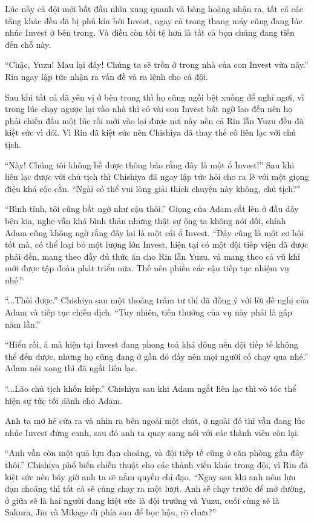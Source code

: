 {Lúc này cả đội mới bắt đầu nhìn xung quanh và bàng hoàng nhận ra, tất cả
các tầng khác đều đã bị phủ kín bới Invest, ngay cả trong thang máy cũng
đang lúc nhúc Invest ở bên trong. Và điều còn tồi tệ hơn là tất cả bọn
chúng đang tiến đến chỗ này.

``Chậc, Yuzu! Mau lại đây! Chúng ta sẽ trốn ở trong nhà của con Invest
vừa nãy.'' Rin ngay lập tức nhận ra vấn đề và ra lệnh cho cả đội.

Sau khi tất cả đã yên vị ở bên trong thì họ cũng ngồi bệt xuống để nghỉ
ngơi, vì trong lúc chạy ngược lại vào nhà thì có vài con Invest bất ngờ
lao đến nên họ phải chiến đấu một lúc rồi mới vào lại được nơi này nên
cả Rin lẫn Yuzu đều đã kiệt sức vì đói. Vì Rin đã kiệt sức nên Chishiya
đã thay thế cô liên lạc với chủ tịch.

``Này! Chúng tôi không hề được thông báo rằng đây là một ổ Invest!'' Sau
khi liên lạc được với chủ tịch thì Chishiya đã ngay lập tức hỏi cho ra
lẽ với một giọng điệu khá cộc cằn. ``Ngài có thể vui lòng giải thích
chuyện này không, chủ tịch?''

``Bình tĩnh, tôi cũng bất ngờ như cậu thôi.'' Giọng của Adam cất lên ở
đầu dây bên kia, nghe vẫn khá bình thản nhưng thật sự ông ta không nói
dối, chính Adam cũng không ngờ rằng đây lại là một cái ổ Invest. ``Đây
cũng là một cơ hội tốt mà, có thể loại bỏ một lượng lớn Invest, hiện tại
có một đội tiếp viện đã được phái đến, mang theo đầy đủ thức ăn cho Rin
lẫn Yuzu, và mang theo cả vũ khí mới được tập đoàn phát triển nữa. Thế
nên phiền các cậu tiếp tục nhiệm vụ nhé.''

``...Thôi được.'' Chishiya sau một thoáng trầm tư thì đã đồng ý với lời
đề nghị của Adam và tiếp tục chiến dịch. ``Tuy nhiên, tiền thưởng của vụ
này phải là gấp năm lần.''

``Hiểu rồi, à mà hiện tại Invest đang phong toả khá đông nên đội tiếp tế
không thể đến được, nhưng họ cũng đang ở gần đó đấy nên mọi người cố
chạy qua nhé.'' Adam nói xong thì đã ngắt liên lạc.

``...Lão chủ tịch khốn kiếp.'' Chishiya sau khi Adam ngắt liên lạc thì
vò tóc thể hiện sự tức tối dành cho Adam.

Anh ta mở hé cửa ra và nhìn ra bên ngoài một chút, ở ngoài đó thì vẫn
đang lúc nhúc Invest đứng canh, sau đó anh ta quay sang nói với các
thành viên còn lại.

``Anh vẫn còn một quả lựu đạn choáng, và đội tiếp tế cũng ở căn phòng
gần đây thôi.'' Chishiya phổ biến chiến thuật cho các thành viên khác
trong đội, vì Rin đã kiệt sức nên bây giờ anh ta sẽ nắm quyền chỉ đạo.
``Ngay sau khi anh ném lựu đạn choáng thì tất cả sẽ cùng chạy ra một
lượt. Anh sẽ chạy trước để mở đường, ở giữa sẽ là hai người đang kiệt
sức là đội trưởng và Yuzu, cuối cùng sẽ là Sakura, Jin và Mikage đi phía
sau để bọc hậu, rõ chưa?''

}
